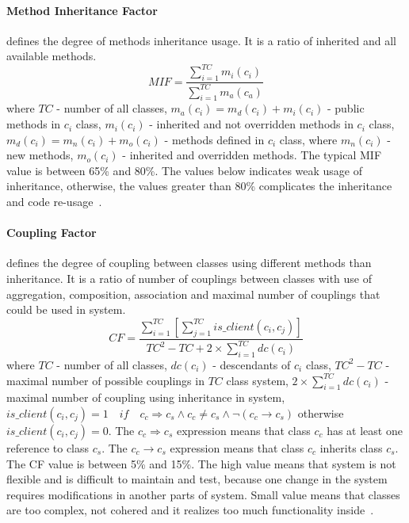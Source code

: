 \paragraph{Method Inheritance Factor} defines the degree of methods inheritance usage. It is a ratio of inherited and all available methods. 
\begin{equation}
MIF=\frac { \sum _{ i=1 }^{ TC }{ { m }_{ i }({ c }_{ i }) }  }{ \sum _{ i=1 }^{ TC }{ { m }_{ a }({ c }_{ a }) }  } 
\end{equation}
where $TC$ - number of all classes, $m_{a}(c_{i}) = m_{d}(c_{i}) + m_{i}(c_{i})$ - public methods in $c_{i}$ class, $m_{i}(c_{i})$ - inherited and not overridden methods in $c_{i}$ class, $m_{d}(c_{i}) = m_{n}(c_{i}) + m_{o}(c_{i})$ - methods defined in $c_{i}$ class, where $m_{n}(c_{i})$ - new methods, $m_{o}(c_{i})$  - inherited and overridden methods. The typical \ac{MIF} value is between 65\% and 80\%. The values below indicates weak usage of inheritance, otherwise, the values greater than 80\% complicates the inheritance and code re-usage~\cite{moodbook, nasa}. 


\paragraph{Coupling Factor} defines the degree of coupling between classes using different methods than inheritance. It is a ratio of number of couplings between classes with use of aggregation, composition, association and maximal number of couplings that could be used in system.  
\begin{equation}
CF=\frac { \sum _{ i=1 }^{ TC }{ \left[ \sum _{ j=1 }^{ TC }{ is\_ client\left( { c }_{ i },{ c }_{ j } \right)  }  \right]  }  }{ { TC }^{ 2 }-TC+2\times \sum _{ i=1 }^{ TC }{ dc({ c }_{ i }) }  } 
\end{equation}	
where $TC$ - number of all classes, $dc(c_{i})$ - descendants of $c_{i}$ class, ${TC}^{2}-TC$ - maximal number of possible couplings in $TC$ class system, $2\times \sum _{ i=1 }^{ TC }{ dc({ c }_{ i }) }$ - maximal number of coupling using inheritance in system,  $is\_ client\left( { c }_{ i },{ c }_{ j } \right) = 1\quad if\quad { c }_{ c }\Rightarrow { c }_{ s }\wedge { c }_{ c }\neq { c }_{ s }\wedge \neg \left( { c }_{ c }{ \rightarrow c }_{ s } \right) $ otherwise $is\_ client\left( { c }_{ i },{ c }_{ j } \right) =0$. The ${ c }_{ c }\Rightarrow { c }_{ s }$ expression means that class $c_{c}$ has at least one reference to class $c_{s}$. The ${ c }_{ c }{ \rightarrow c }_{ s }$ expression means that  class $c_{c}$ inherits class $c_{s}$. The \ac{CF} value is between 5\% and 15\%. The high value means that system is not flexible and is difficult to maintain and test, because one change in the system requires modifications in another parts of system. Small value means that classes are too complex, not cohered and it realizes too much functionality inside~\cite{moodbook, nasa}.
